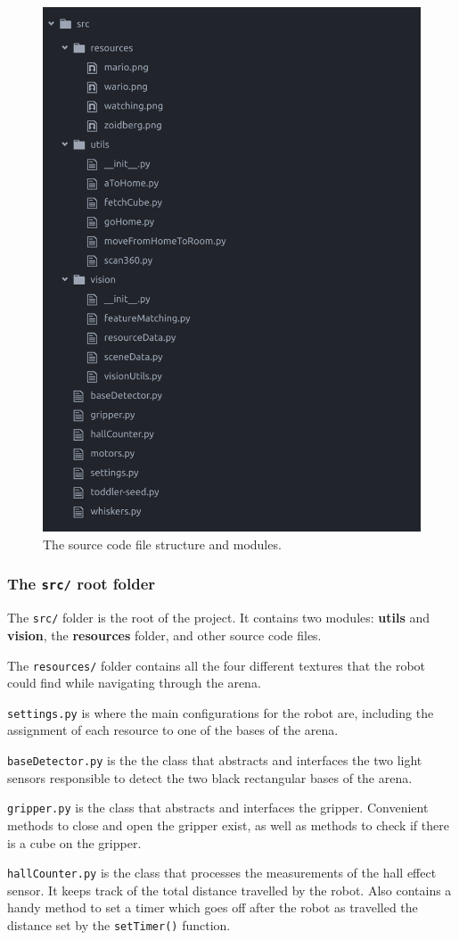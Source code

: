 \begin{figure}[ht]
    \centering
    \includegraphics[width=0.5\linewidth]{res/source-architecture.png}
    \caption{The source code file structure and modules.}
    \label{fig:source-architecture}
\end{figure}

\clearpage

\subsubsection{The \texttt{src/} root folder}

The \texttt{src/} folder is the root of the project. It contains two modules: \textbf{utils} and \textbf{vision}, the \textbf{resources} folder, and other source code files.

The \texttt{resources/} folder contains all the four different textures that the robot could find while navigating through the arena.

\texttt{settings.py} is where the main configurations for the robot are, including the assignment of each resource to one of the bases of the arena.

\texttt{baseDetector.py} is the the class that abstracts and interfaces the two light sensors responsible to detect the two black rectangular bases of the arena.

\texttt{gripper.py} is the class that abstracts and interfaces the gripper. Convenient methods to close and open the gripper exist, as well as methods to check if there is a cube on the gripper.

\texttt{hallCounter.py} is the class that processes the measurements of the hall effect sensor. It keeps track of the total distance travelled by the robot. Also contains a handy method to set a timer which goes off after the robot as travelled the distance set by the \texttt{setTimer()} function.

